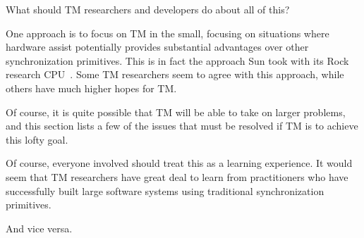 What should TM researchers and developers do about all of this?

One approach is to focus on TM in the small, focusing on situations
where hardware assist potentially provides substantial advantages over
other synchronization primitives.
This is in fact the approach Sun took with its Rock research
CPU~\cite{DaveDice2009ASPLOSRockHTM}.
Some TM researchers seem to agree with this approach, while others have
much higher hopes for TM.

Of course, it is quite possible that TM will be able to take on larger
problems, and this section lists a few of the issues that
must be resolved if TM is to achieve this lofty goal.

Of course, everyone involved should treat this as a learning experience.
It would seem that TM researchers have great deal to learn from
practitioners who have successfully built large software systems using
traditional synchronization primitives.

And vice versa.


